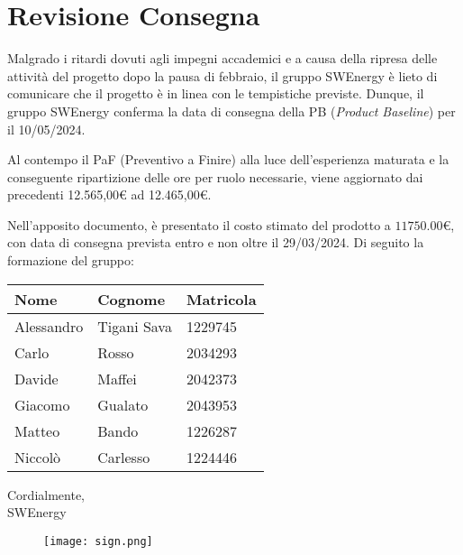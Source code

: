 \section{Revisione Consegna}

Malgrado i ritardi dovuti agli impegni accademici e a causa della ripresa delle
attività del progetto dopo la pausa di febbraio, il gruppo SWEnergy è lieto di
comunicare che il progetto è in linea con le tempistiche previste. Dunque, il
gruppo SWEnergy conferma la data di consegna della PB (\textit{Product Baseline})
per il 10/05/2024.

Al contempo il PaF (Preventivo a Finire) alla luce dell’esperienza maturata e la 
conseguente ripartizione delle ore per ruolo necessarie, viene aggiornato dai 
precedenti 12.565,00€ ad 12.465,00€.


Nell'apposito documento, è presentato il costo stimato del prodotto a
$11750.00$\euro,
con data di consegna prevista entro e non oltre il 29/03/2024. Di seguito la
formazione del gruppo:
\begin{center}
	{
		\renewcommand{\arraystretch}{1.5}
		\begin{tabular}{lll}
			\textbf{Nome} & \textbf{Cognome} & \textbf{Matricola} \\
			\hline
			Alessandro    & Tigani Sava      & 1229745            \\
			Carlo         & Rosso            & 2034293            \\
			Davide        & Maffei           & 2042373            \\
			Giacomo       & Gualato          & 2043953            \\
			Matteo        & Bando            & 1226287            \\
			Niccolò       & Carlesso         & 1224446            \\
			\hline
		\end{tabular}
	}
\end{center}

\vspace{1cm}

\noindent
Cordialmente, \\
SWEnergy

\begin{figure}[H]
	\texttt{[image: sign.png]}
\end{figure}
